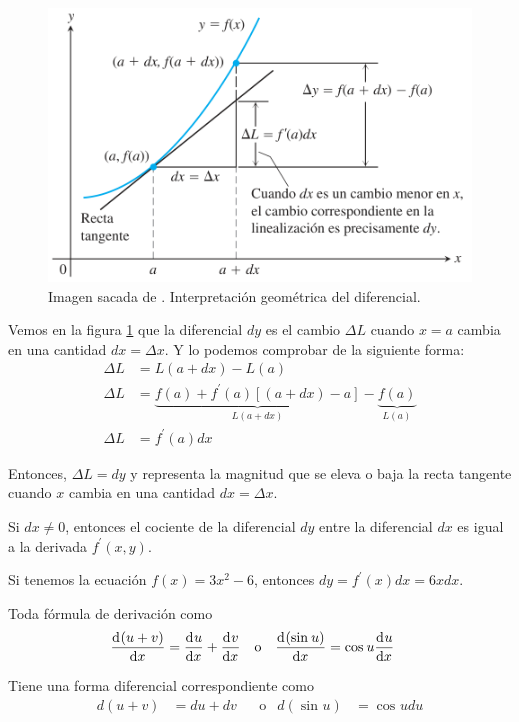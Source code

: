 \documentclass[12pt]{article}
\begin{document}
\begin{figure}[H]
  \centering
  \includegraphics[width=0.5\linewidth]{imagenes/interp_geom_diferencial.png}
  \caption{Imagen sacada de \parencite{thomas_calc_uv}. Interpretación geométrica del diferencial.}
  \label{fig:interp_geom_diferencial}
\end{figure}

Vemos en la figura \ref{fig:interp_geom_diferencial} que la diferencial $ dy $ es el cambio $ \Delta L $ cuando $ x = a $ cambia en una cantidad $ dx = \Delta x $. Y lo podemos comprobar de la siguiente forma:
\begin{align*}
  \Delta L &= L(a + dx) - L(a)\\
  \Delta L &= \underbrace{f(a) + f^{\prime}(a)\left[(a + dx) - a\right]}_{L(a + dx)} - \underbrace{f(a)}_{L(a)}\\
  \Delta L &= f^{\prime}(a)dx
\end{align*}

Entonces, $ \Delta L = dy $ y representa la magnitud que se eleva o baja la recta tangente cuando $ x $ cambia en una cantidad $ dx = \Delta x $.

Si $ dx \neq 0 $, entonces el cociente de la diferencial $ dy $ entre la diferencial $ dx $ es igual a la derivada $ f^{\prime} (x,y) $.

Si tenemos la ecuación $ f(x) = 3x^{2} - 6 $, entonces $ dy = f^{\prime}(x)dx = 6xdx $.

Toda fórmula de derivación como 
\begin{align*}
	\dv[]{(u + v)}{x} &= \dv[]{u}{x} + \dv[]{v}{x} && \text{o} & \dv[]{(\sin^{}u)}{x} &= \cos^{}u\dv[]{u}{x}
\end{align*}

Tiene una forma diferencial correspondiente como 
\begin{align*}
	d(u+v) &= du+dv && \text{o} & d(\sin^{}u) &= \cos^{}udu
\end{align*}
\end{document}
